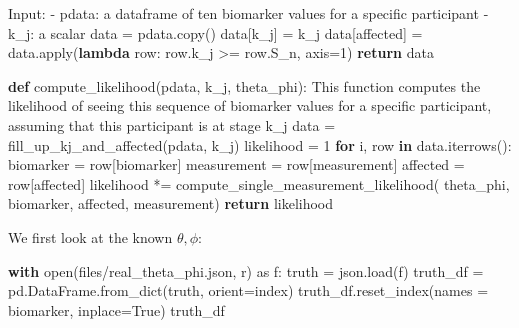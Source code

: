 \documentclass[
  letterpaper,
  DIV=11,
  numbers=noendperiod]{scrreprt}
\newenvironment{Shaded}{\begin{snugshade}}{\end{snugshade}}
\newcommand{\BuiltInTok}[1]{\textcolor[rgb]{0.00,0.23,0.31}{#1}}
\newcommand{\CommentTok}[1]{\textcolor[rgb]{0.37,0.37,0.37}{#1}}
\newcommand{\ControlFlowTok}[1]{\textcolor[rgb]{0.00,0.23,0.31}{\textbf{#1}}}
\newcommand{\DecValTok}[1]{\textcolor[rgb]{0.68,0.00,0.00}{#1}}
\newcommand{\ImportTok}[1]{\textcolor[rgb]{0.00,0.46,0.62}{#1}}
\newcommand{\KeywordTok}[1]{\textcolor[rgb]{0.00,0.23,0.31}{\textbf{#1}}}
\newcommand{\NormalTok}[1]{\textcolor[rgb]{0.00,0.23,0.31}{#1}}
\newcommand{\OperatorTok}[1]{\textcolor[rgb]{0.37,0.37,0.37}{#1}}
\newcommand{\StringTok}[1]{\textcolor[rgb]{0.13,0.47,0.30}{#1}}
\newcommand{\VariableTok}[1]{\textcolor[rgb]{0.07,0.07,0.07}{#1}}
\begin{document}
\begin{Shaded}
\begin{Highlighting}[]
\CommentTok{    Input:}
\CommentTok{    {-} pdata: a dataframe of ten biomarker values for a specific participant }
\CommentTok{    {-} k\_j: a scalar}
\CommentTok{    \textquotesingle{}\textquotesingle{}\textquotesingle{}}
\NormalTok{    data }\OperatorTok{=}\NormalTok{ pdata.copy()}
\NormalTok{    data[}\StringTok{\textquotesingle{}k\_j\textquotesingle{}}\NormalTok{] }\OperatorTok{=}\NormalTok{ k\_j}
\NormalTok{    data[}\StringTok{\textquotesingle{}affected\textquotesingle{}}\NormalTok{] }\OperatorTok{=}\NormalTok{ data.}\BuiltInTok{apply}\NormalTok{(}\KeywordTok{lambda}\NormalTok{ row: row.k\_j }\OperatorTok{\textgreater{}=}\NormalTok{ row.S\_n, axis}\OperatorTok{=}\DecValTok{1}\NormalTok{)}
    \ControlFlowTok{return}\NormalTok{ data}

\KeywordTok{def}\NormalTok{ compute\_likelihood(pdata, k\_j, theta\_phi):}
    \CommentTok{\textquotesingle{}\textquotesingle{}\textquotesingle{}}
\CommentTok{    This function computes the likelihood of seeing this sequence of biomarker values }
\CommentTok{    for a specific participant, assuming that this participant is at stage k\_j}
\CommentTok{    \textquotesingle{}\textquotesingle{}\textquotesingle{}}
\NormalTok{    data }\OperatorTok{=}\NormalTok{ fill\_up\_kj\_and\_affected(pdata, k\_j)}
\NormalTok{    likelihood }\OperatorTok{=} \DecValTok{1}
    \ControlFlowTok{for}\NormalTok{ i, row }\KeywordTok{in}\NormalTok{ data.iterrows():}
\NormalTok{        biomarker }\OperatorTok{=}\NormalTok{ row[}\StringTok{\textquotesingle{}biomarker\textquotesingle{}}\NormalTok{]}
\NormalTok{        measurement }\OperatorTok{=}\NormalTok{ row[}\StringTok{\textquotesingle{}measurement\textquotesingle{}}\NormalTok{]}
\NormalTok{        affected }\OperatorTok{=}\NormalTok{ row[}\StringTok{\textquotesingle{}affected\textquotesingle{}}\NormalTok{]}
\NormalTok{        likelihood }\OperatorTok{*=}\NormalTok{ compute\_single\_measurement\_likelihood(}
\NormalTok{            theta\_phi, biomarker, affected, measurement)}
    \ControlFlowTok{return}\NormalTok{ likelihood}
\end{Highlighting}
\end{Shaded}

We first look at the known \(\theta, \phi\):

\begin{Shaded}
\begin{Highlighting}[]
\ControlFlowTok{with} \BuiltInTok{open}\NormalTok{(}\StringTok{\textquotesingle{}files/real\_theta\_phi.json\textquotesingle{}}\NormalTok{, }\StringTok{\textquotesingle{}r\textquotesingle{}}\NormalTok{) }\ImportTok{as}\NormalTok{ f:}
\NormalTok{    truth }\OperatorTok{=}\NormalTok{ json.load(f)}
\NormalTok{truth\_df }\OperatorTok{=}\NormalTok{ pd.DataFrame.from\_dict(truth, orient}\OperatorTok{=}\StringTok{\textquotesingle{}index\textquotesingle{}}\NormalTok{)}
\NormalTok{truth\_df.reset\_index(names }\OperatorTok{=} \StringTok{\textquotesingle{}biomarker\textquotesingle{}}\NormalTok{, inplace}\OperatorTok{=}\VariableTok{True}\NormalTok{)}
\NormalTok{truth\_df}
\end{Highlighting}
\end{Shaded}
\end{document}
